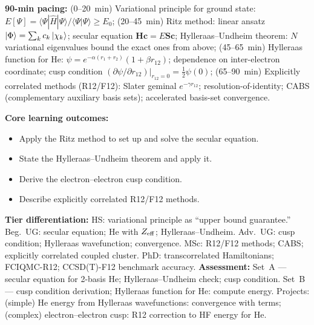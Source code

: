 \documentclass[11pt,a4paper]{article}
\begin{document}
\begin{tcolorbox}[chembox, title={Module~III.2 / L07: Variational Methods}]
\textbf{90-min pacing:} (0--20~min) Variational principle for ground state: $E[\Psi]=\langle\Psi|\hat{H}|\Psi\rangle/\langle\Psi|\Psi\rangle\geq E_0$; (20--45~min) Ritz method: linear ansatz $\ket{\Phi}=\sum_k c_k\ket{\chi_k}$; secular equation $\mathbf{H}\mathbf{c}=E\mathbf{S}\mathbf{c}$; Hylleraas--Undheim theorem: $N$ variational eigenvalues bound the exact ones from above; (45--65~min) Hylleraas function for He: $\psi=e^{-\alpha(r_1+r_2)}(1+\beta r_{12})$; dependence on inter-electron coordinate; cusp condition $(\partial\psi/\partial r_{12})|_{r_{12}=0}=\tfrac{1}{2}\psi(0)$; (65--90~min) Explicitly correlated methods (R12/F12): Slater geminal $e^{-\gamma r_{12}}$; resolution-of-identity; CABS (complementary auxiliary basis sets); accelerated basis-set convergence.

\medskip\textbf{Core learning outcomes:}
\begin{itemize}[leftmargin=1.4em,topsep=2pt,itemsep=1pt]
  \item Apply the Ritz method to set up and solve the secular equation.
  \item State the Hylleraas--Undheim theorem and apply it.
  \item Derive the electron--electron cusp condition.
  \item Describe explicitly correlated R12/F12 methods.
\end{itemize}
\medskip\textbf{Tier differentiation:}
HS: variational principle as ``upper bound guarantee.''
Beg.\ UG: secular equation; He with $Z_{\rm eff}$; Hylleraas--Undheim.
Adv.\ UG: cusp condition; Hylleraas wavefunction; convergence.
MSc: R12/F12 methods; CABS; explicitly correlated coupled cluster.
PhD: transcorrelated Hamiltonians; FCIQMC-R12; CCSD(T)-F12 benchmark accuracy.
\medskip\textbf{Assessment:}
Set~A --- secular equation for 2-basis He; Hylleraas--Undheim check; cusp condition.
Set~B --- cusp condition derivation; Hylleraas function for He: compute energy.
Projects: (simple) He energy from Hylleraas wavefunctions: convergence with terms; (complex) electron--electron cusp: R12 correction to HF energy for He.
\end{tcolorbox}

\medskip
\end{document}
